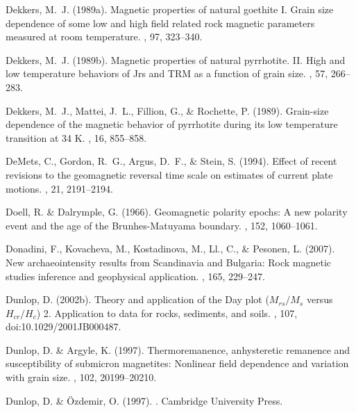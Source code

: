 Dekkers, M.~J. (1989a).
\newblock Magnetic properties of natural goethite {I}. Grain size dependence of
  some low and high field related rock magnetic parameters measured at room
  temperature.
, 97, 323--340.

Dekkers, M.~J. (1989b).
\newblock Magnetic properties of natural pyrrhotite. {II}. High and low
  temperature behaviors of Jrs and {TRM} as a function of grain size.
, 57, 266--283.

Dekkers, M.~J., Mattei, J.~L., Fillion, G., \& Rochette, P. (1989).
\newblock Grain-size dependence of the magnetic behavior of pyrrhotite during
  its low temperature transition at 34 {K}.
, 16, 855--858.

DeMets, C., Gordon, R.~G., Argus, D.~F., \& Stein, S. (1994).
\newblock Effect of recent revisions to the geomagnetic reversal time scale on
  estimates of current plate motions.
, 21, 2191--2194.

Doell, R. \& Dalrymple, G. (1966).
\newblock Geomagnetic polarity epochs: A new polarity event and the age of the
  Brunhes-Matuyama boundary.
, 152, 1060--1061.

Donadini, F., Kovacheva, M., Kostadinova, M., Ll., C., \& Pesonen, L. (2007).
\newblock New archaeointensity results from Scandinavia and Bulgaria: Rock
  magnetic studies inference and geophysical application.
, 165, 229--247.

Dunlop, D. (2002b).
\newblock Theory and application of the Day plot ($M_{rs}/M_s$ versus
  $H_{cr}/H_c$) 2. Application to data for rocks, sediments, and soils.
, 107, doi:10.1029/2001JB000487.

Dunlop, D. \& Argyle, K. (1997).
\newblock Thermoremanence, anhysteretic remanence and susceptibility of
  submicron magnetites: Nonlinear field dependence and variation with grain
  size.
, 102, 20199--20210.

Dunlop, D. \& \"Ozdemir, O. (1997).
.
\newblock Cambridge University Press.

